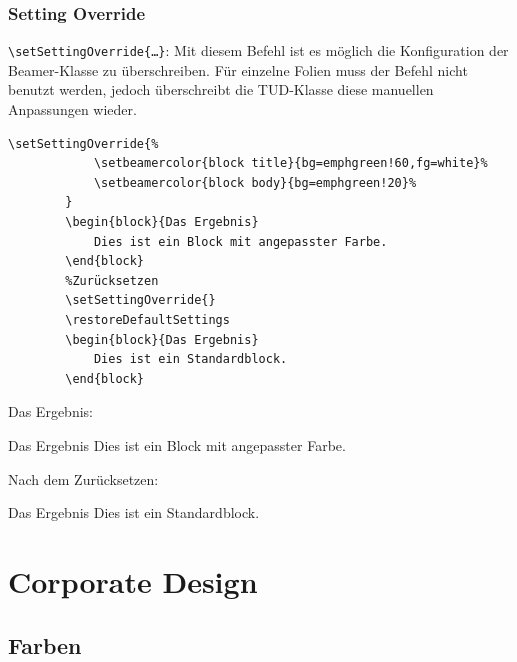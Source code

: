 \documentclass[german,notoc]{tudbeamer}%
\begin{document}
\begin{frame}
	\frametitle{Setting Override}
\texttt{\textbackslash setSettingOverride\{\dots\}}:
	Mit diesem Befehl ist es möglich die Konfiguration der Beamer-Klasse zu überschreiben. Für einzelne Folien muss der Befehl nicht benutzt werden, jedoch überschreibt die TUD-Klasse diese manuellen Anpassungen wieder.
	\begin{lstlisting}[gobble=4,style=latex]
		\setSettingOverride{%					
		    \setbeamercolor{block title}{bg=emphgreen!60,fg=white}%
		    \setbeamercolor{block body}{bg=emphgreen!20}%
		}
		\begin{block}{Das Ergebnis}
			Dies ist ein Block mit angepasster Farbe. 
		\end{block}
		%Zurücksetzen
		\setSettingOverride{}
		\restoreDefaultSettings
		\begin{block}{Das Ergebnis}
			Dies ist ein Standardblock. 
		\end{block}
	\end{lstlisting}
\framebreak
	Das Ergebnis:
	\begin{block}{Das Ergebnis}
		Dies ist ein Block mit angepasster Farbe. 
	\end{block}
	Nach dem Zurücksetzen:
	\setSettingOverride{}
	\restoreDefaultSettings
	\begin{block}{Das Ergebnis}
		Dies ist ein Standardblock. 
	\end{block}
\end{frame}

\section{Corporate Design}
\subsection{Farben}
\end{document}
